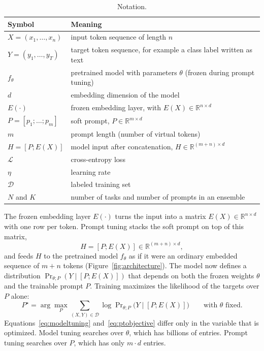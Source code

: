 \documentclass[12pt]{article}
\newcommand{\R}{\mathbb{R}}
\newcommand{\loss}{\mathcal{L}}
\newcommand{\data}{\mathcal{D}}
\newcommand{\PrTP}{\Pr\nolimits_{\theta;P}}
\begin{document}
\begin{table}[htbp]
  \centering
  \caption{Notation.}
  \label{tab:notation}
  \small
  \begin{tabular}{@{}l l@{}}
    \toprule
    \textbf{Symbol} & \textbf{Meaning}\\
    \midrule
    $X=(x_1,\dots,x_n)$ & input token sequence of length $n$\\
    $Y=(y_1,\dots,y_T)$ & target token sequence, for example a class label written as text\\
    $f_\theta$          & pretrained model with parameters $\theta$ (frozen during prompt tuning)\\
    $d$                 & embedding dimension of the model\\
    $E(\cdot)$          & frozen embedding layer, with $E(X)\in\R^{n\times d}$\\
    $P=[p_1;\dots;p_m]$ & soft prompt, $P\in\R^{m\times d}$\\
    $m$                 & prompt length (number of virtual tokens)\\
    $H=[P;E(X)]$        & model input after concatenation, $H\in\R^{(m+n)\times d}$\\
    $\loss$             & cross-entropy loss\\
    $\eta$              & learning rate\\
    $\data$             & labeled training set\\
    $N$ and $K$         & number of tasks and number of prompts in an ensemble\\
    \bottomrule
  \end{tabular}
\end{table}

The frozen embedding layer $E(\cdot)$ turns the input into a matrix $E(X)\in\R^{n\times d}$
with one row per token. Prompt tuning stacks the soft prompt on top of this matrix,
\begin{equation}
  H=[P;E(X)]\in\R^{(m+n)\times d},
  \label{eq:concat}
\end{equation}
and feeds $H$ to the pretrained model $f_\theta$ as if it were an ordinary embedded sequence
of $m+n$ tokens (Figure~\ref{fig:architecture}). The model now defines a distribution
$\PrTP(Y\mid[P;E(X)])$ that depends on both the frozen weights $\theta$ and the trainable
prompt $P$. Training maximizes the likelihood of the targets over $P$ alone:
\begin{equation}
  P^{\star}=\arg\max_{P}\sum_{(X,Y)\in\data}\log\PrTP\bigl(Y\mid[P;E(X)]\bigr)
  \qquad\text{with $\theta$ fixed}.
  \label{eq:ptobjective}
\end{equation}
Equations~\eqref{eq:modeltuning} and~\eqref{eq:ptobjective} differ only in the variable that
is optimized. Model tuning searches over $\theta$, which has billions of entries. Prompt
tuning searches over $P$, which has only $m\cdot d$ entries.
\end{document}

